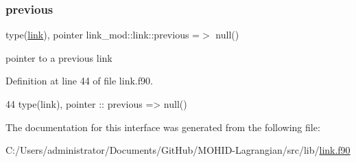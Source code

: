 \subsubsection{\texorpdfstring{previous}{previous}}
{\footnotesize\ttfamily type(\mbox{\hyperlink{structlink__mod_1_1link}{link}}), pointer link\+\_\+mod\+::link\+::previous =$>$ null()\hspace{0.3cm}{\ttfamily [private]}}



pointer to a previous link 



Definition at line 44 of file link.\+f90.


\begin{DoxyCode}
44         \textcolor{keywordtype}{type}(link), \textcolor{keywordtype}{pointer} :: previous => null() 
\end{DoxyCode}


The documentation for this interface was generated from the following file\+:\begin{DoxyCompactItemize}
\item 
C\+:/\+Users/administrator/\+Documents/\+Git\+Hub/\+M\+O\+H\+I\+D-\/\+Lagrangian/src/lib/\mbox{\hyperlink{link_8f90}{link.\+f90}}\end{DoxyCompactItemize}
